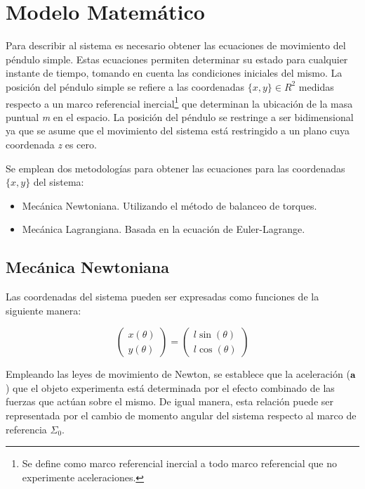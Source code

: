\section{Modelo Matemático}

Para describir al sistema es necesario obtener las ecuaciones 
de movimiento del péndulo simple. 
Estas ecuaciones permiten 
determinar su estado para cualquier 
instante de tiempo, tomando en cuenta las condiciones 
iniciales del mismo. 
La posición del péndulo simple se refiere a 
las coordenadas  $\{x, y\} \in R^2$  medidas respecto a un marco 
referencial inercial\footnote{Se define como marco 
referencial inercial a todo marco referencial que no 
experimente aceleraciones.} 
que determinan la ubicación de 
la masa puntual \emph{m} en el espacio.
La posición del péndulo se restringe a ser bidimensional
ya que se asume que el movimiento del sistema está restringido a un plano
cuya coordenada \emph{z} es cero.

Se emplean dos metodologías para obtener las ecuaciones para las coordenadas 
$\{x, y\}$ del sistema:
\begin{itemize}
 \item Mecánica Newtoniana. Utilizando el método de balanceo de torques.
 \item Mecánica Lagrangiana. Basada en la ecuación de Euler-Lagrange.
\end{itemize}




\subsection{Mecánica Newtoniana}

Las coordenadas del sistema pueden ser expresadas como funciones
de la siguiente manera:

\begin{equation}
 \begin{pmatrix}
 x(\theta)\\
 y(\theta)
 \end{pmatrix}
 = \begin{pmatrix}
 l \sin (\theta)\\
 l \cos (\theta)
 \end{pmatrix}
 \label{eq: system coordinates}
\end{equation}

Empleando las leyes de movimiento de Newton, 
se establece que la aceleración ($\bold{a}$) que el objeto
experimenta está determinada por el
efecto combinado de las fuerzas que actúan sobre el mismo.
De igual manera, esta relación puede ser representada por
el cambio de momento angular del sistema respecto al 
marco de referencia $\Sigma_0$.

